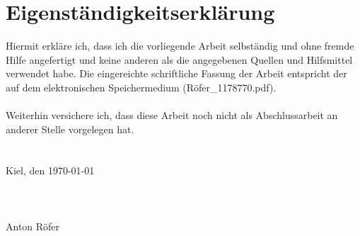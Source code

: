 \section*{Eigenständigkeitserklärung}
Hiermit erkläre ich, dass ich die vorliegende Arbeit selbständig und ohne fremde Hilfe 
angefertigt und keine anderen als die angegebenen Quellen und Hilfsmittel verwendet 
habe. Die eingereichte schriftliche Fassung der Arbeit entspricht der auf dem elektronischen Speichermedium (Röfer\_1178770.pdf). \\
\\
Weiterhin versichere ich, dass diese Arbeit noch nicht als Abschlussarbeit an anderer 
Stelle vorgelegen hat. \\
\\
\\
Kiel, den \today\\
\\
\\
\\
Anton Röfer